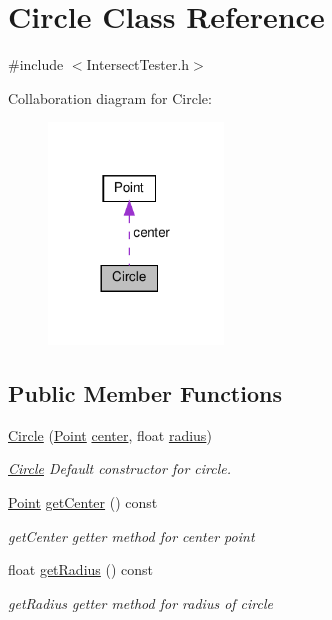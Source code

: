 \hypertarget{class_circle}{}\section{Circle Class Reference}
\label{class_circle}


{\ttfamily \#include $<$Intersect\+Tester.\+h$>$}



Collaboration diagram for Circle\+:\nopagebreak
\begin{figure}[H]
\begin{center}
\leavevmode
\includegraphics[width=132pt]{class_circle__coll__graph}
\end{center}
\end{figure}
\subsection*{Public Member Functions}
\begin{DoxyCompactItemize}
\item 
\hyperlink{class_circle_a7a761c34c5a913be8bc0b05ea0dc327c}{Circle} (\hyperlink{class_point}{Point} \hyperlink{class_circle_a8c4026a5a34d2df1527f019dd456317b}{center}, float \hyperlink{class_circle_a47644132ec8bec0f3a4e8d0e15bcd5d3}{radius})
\begin{DoxyCompactList}\small\item\em \hyperlink{class_circle}{Circle} Default constructor for circle. \end{DoxyCompactList}\item 
\hyperlink{class_point}{Point} \hyperlink{class_circle_a9818ca0bbac64ff447945a8e51ff9319}{get\+Center} () const
\begin{DoxyCompactList}\small\item\em get\+Center getter method for center point \end{DoxyCompactList}\item 
float \hyperlink{class_circle_a95b7dc25d2e9b1e40a189cd83386a12e}{get\+Radius} () const
\begin{DoxyCompactList}\small\item\em get\+Radius getter method for radius of circle \end{DoxyCompactList}\end{DoxyCompactItemize}
